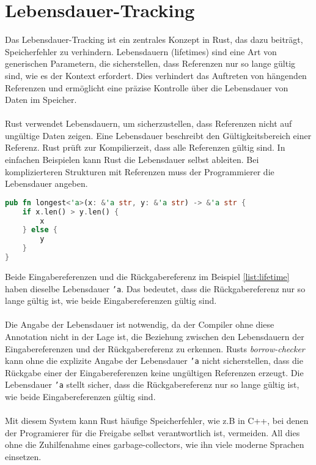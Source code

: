 \chapter{Lebensdauer-Tracking}

Das Lebensdauer-Tracking ist ein zentrales Konzept in Rust, das dazu beiträgt, Speicherfehler zu verhindern. 
Lebensdauern (lifetimes) sind eine Art von generischen Parametern, die sicherstellen, dass Referenzen nur so lange gültig sind, wie es der Kontext erfordert. 
Dies verhindert das Auftreten von hängenden Referenzen und ermöglicht eine präzise Kontrolle über die Lebensdauer von Daten im Speicher.\\
\\
Rust verwendet Lebensdauern, um sicherzustellen, dass Referenzen nicht auf ungültige Daten zeigen.
Eine Lebensdauer beschreibt den Gültigkeitsbereich einer Referenz. 
Rust prüft zur Kompilierzeit, dass alle Referenzen gültig sind. 
In einfachen Beispielen kann Rust die Lebensdauer selbst ableiten. 
Bei komplizierteren Strukturen mit Referenzen muss der Programmierer die Lebensdauer angeben.

\begin{lstlisting}[language=Rust, caption={Expliziete lifetime}, label=list:lifetime]
pub fn longest<'a>(x: &'a str, y: &'a str) -> &'a str {
    if x.len() > y.len() {
        x
    } else {
        y
    }
}
\end{lstlisting}
\noindent
Beide Eingabereferenzen und die Rückgabereferenz im Beispiel \ref{list:lifetime} haben dieselbe Lebensdauer \texttt{'a}. 
Das bedeutet, dass die Rückgabereferenz nur so lange gültig ist, wie beide Eingabereferenzen gültig sind.\\
\\
Die Angabe der Lebensdauer ist notwendig, da der Compiler ohne diese Annotation nicht in der Lage ist, die Beziehung zwischen den Lebensdauern der Eingabereferenzen und der Rückgabereferenz zu erkennen. 
Rusts \textit{\gls{borrow-checker}} kann ohne die explizite Angabe der Lebensdauer \texttt{'a} nicht sicherstellen, dass die Rückgabe einer der Eingabereferenzen keine ungültigen Referenzen erzeugt. 
Die Lebensdauer \texttt{'a} stellt sicher, dass die Rückgabereferenz nur so lange gültig ist, wie beide Eingabereferenzen gültig sind.\\
\\
Mit diesem System kann Rust häufige Speicherfehler, wie z.B in C++, bei denen der Programierer für die Freigabe selbst verantwortlich ist, vermeiden.
All dies ohne die Zuhilfenahme eines garbage-collectors, wie ihn viele moderne Sprachen einsetzen.
